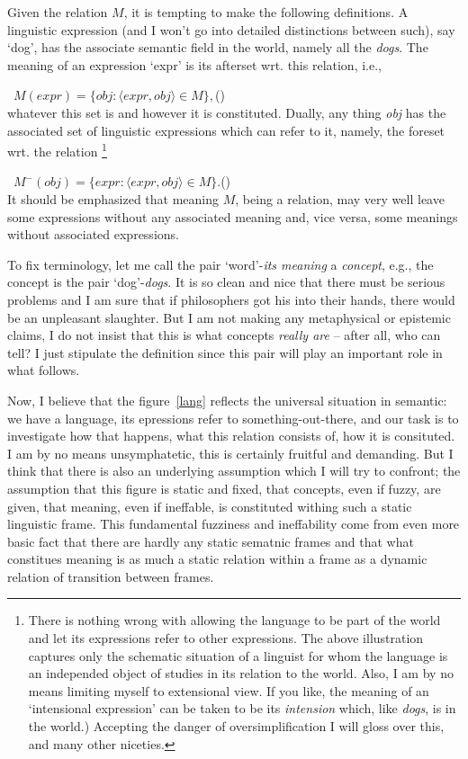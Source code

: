 \documentclass[10pt]{article}
\newcounter{EQ}
\newcommand{\equ}[1]{\refstepcounter{EQ}\vspace{.5ex}\par\noindent\ 
    \hfill $#1$\hfill{(\theEQ)}\\[.5ex]}
\newcommand{\<}{\langle}
\renewcommand{\>}{\rangle}
\newcommand{\co}[1]{{\sf{#1}}}
\newcommand{\wo}[1]{`#1'}
\newcommand{\thi}[1]{{\sl{#1}\/}}
\begin{document}
Given the relation $M$, it is tempting to make the following 
definitions. A linguistic expression (and I won't go into detailed 
distinctions between such), say \wo{dog}, has the associate semantic 
field in the world, namely all the \thi{dogs}. 
The meaning of an expression 
\wo{expr} is its afterset wrt. this relation, i.e., 
\equ{M({expr})=\{ {obj}:\<{expr},{obj}\> \in M\},}
whatever this set is and 
however it is constituted. Dually, any thing \thi{obj} has the associated 
set of linguistic expressions which can refer to it, namely, the foreset 
wrt. the relation \footnote{There is nothing wrong with allowing the language 
to be part 
of the world and let its expressions refer to other expressions. The above 
illustration captures only the schematic situation of a linguist for whom
the language is an independed object of studies in its relation to the world.
Also, I am by no means
limiting myself to extensional view. If you like, the meaning of an 
\wo{intensional expression} can be taken to be its \thi{intension} which, 
like \thi{dogs}, is in the world.)
Accepting the danger of oversimplification I will gloss over this, and many 
other niceties.} 
\equ{M^-({obj})=\{{expr}:\<{expr},{obj}\> \in M\}.}
It should be emphasized that meaning $M$, being a relation, may very well 
leave some expressions without any associated meaning and, vice versa, some 
meanings without associated expressions.
 
To fix terminology, let me call the pair 
\wo{word}-\thi{its meaning} a {\em concept}, e.g., the concept \co{dog} is 
the pair \wo{dog}-\thi{dogs}.
It is so clean and nice that there must be serious problems and I am sure 
that if philosophers got his into their hands, there would be an 
unpleasant slaughter. But I am not making any metaphysical or epistemic 
claims, I do not insist that this is what concepts {\em really 
are} -- after all, who can tell? I just stipulate the definition since this 
pair will play an important role in what follows.


Now, I believe that the figure~\ref{lang} reflects the universal situation 
in semantic: we have a language, its epressions refer to 
something-out-there, and our task is to investigate how that happens, what 
this relation consists of, how it is consituted. I am by no means 
unsymphatetic, this is certainly fruitful and demanding. But I think that 
there is also an underlying assumption which I will try to confront; the 
assumption that this figure is static and fixed, that concepts, even if 
fuzzy, are given, that meaning, even if ineffable, is constituted withing 
such a static linguistic frame. This fundamental fuzziness and ineffability  
come from even more basic fact that there are hardly any static sematnic 
frames and that what constitues meaning is as much a static relation within 
a frame as a dynamic relation of transition between frames.
\end{document}
